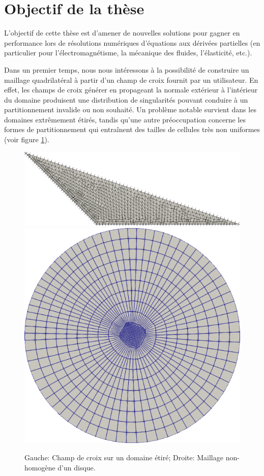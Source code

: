 \section{Objectif de la thèse}


L'objectif de cette thèse est d'amener de nouvelles solutions pour gagner en performance lors de résolutions numériques d'équations aux dérivées partielles (en particulier pour l'électromagnétisme, la mécanique des fluides, l'élasticité, etc.).

Dans un premier temps, nous nous intéressons à la possibilité de construire un maillage quadrilatéral à partir d'un champ de croix fournit par un utilisateur. En effet, les champs de croix générer en propageant la normale extérieur à l'intérieur du domaine \cite{kowalski2013pde} produisent une distribution de singularités pouvant conduire à un partitionnement invalide ou non souhaité. Un problème notable survient dans les domaines extrêmement étirés, tandis qu'une autre préoccupation concerne les formes de partitionnement qui entraînent des tailles de cellules très non uniformes (voir figure \ref{fig:dom_etire_mesh_inhomogene}).

\begin{figure}[!h]
    \centering
    \includegraphics[scale=0.18]{images/stretch.pdf}
    \includegraphics[scale=0.22]{images/new_cercle.png}
    \caption{Gauche: Champ de croix sur un domaine étiré; Droite: Maillage non-homogène d'un disque.}
    \label{fig:dom_etire_mesh_inhomogene}
\end{figure}

